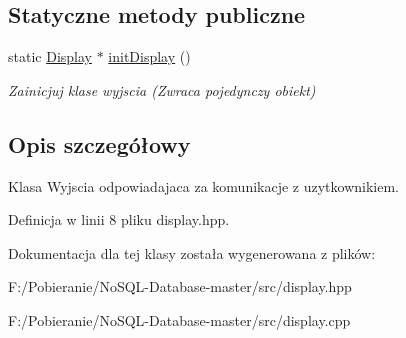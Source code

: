 \subsection*{Statyczne metody publiczne}
\begin{DoxyCompactItemize}
\item 
\mbox{\label{class_display_a38528a0104dcd6822e2b0148bbcd113c}} 
static \mbox{\hyperlink{class_display}{Display}} $\ast$ \mbox{\hyperlink{class_display_a38528a0104dcd6822e2b0148bbcd113c}{init\+Display}} ()
\begin{DoxyCompactList}\small\item\em Zainicjuj klase wyjscia (Zwraca pojedynczy obiekt) \end{DoxyCompactList}\end{DoxyCompactItemize}


\subsection{Opis szczegółowy}
Klasa Wyjscia odpowiadajaca za komunikacje z uzytkownikiem. 

Definicja w linii 8 pliku display.\+hpp.



Dokumentacja dla tej klasy została wygenerowana z plików\+:\begin{DoxyCompactItemize}
\item 
F\+:/\+Pobieranie/\+No\+S\+Q\+L-\/\+Database-\/master/src/display.\+hpp\item 
F\+:/\+Pobieranie/\+No\+S\+Q\+L-\/\+Database-\/master/src/display.\+cpp\end{DoxyCompactItemize}
